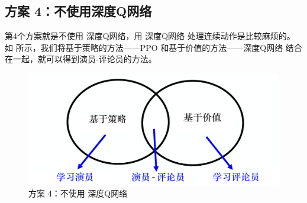\subsection{方案 4：不使用深度Q网络}  

第4个方案就是不使用 深度Q网络，用 深度Q网络 处理连续动作是比较麻烦的。
如 所示，我们将基于策略的方法------PPO 和基于价值的方法------深度Q网络 结合在一起，就可以得到演员-评论员的方法。

\begin{figure}[htpb]
  \centering
  \includegraphics[width=0.5\linewidth]{res/ch8/8.3}
  \caption{方案 4：不使用 深度Q网络}
  \label{fig:fig8.3}
\end{figure}


